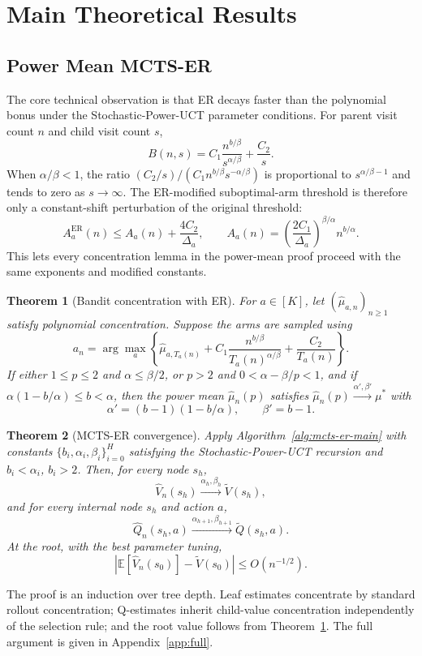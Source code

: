 \documentclass{article}
\newtheorem{theorem}{Theorem}
\newcommand{\E}{\mathbb{E}}
\newcommand{\Vhat}{\widehat{V}}
\newcommand{\Qhat}{\widehat{Q}}
\newcommand{\muhat}{\widehat{\mu}}
\begin{document}
\section{Main Theoretical Results}
\label{sec:main_results}
\subsection{Power Mean MCTS-ER}
\label{sec:main_power_results}
The core technical observation is that ER decays faster than the polynomial bonus under the Stochastic-Power-UCT parameter conditions.  For parent visit count $n$ and child visit count $s$,
\begin{equation}
B(n,s)=C_1\frac{n^{b/\beta}}{s^{\alpha/\beta}}+\frac{C_2}{s}.
\label{eq:main_combined_bonus}
\end{equation}
When $\alpha/\beta<1$, the ratio $(C_2/s)/(C_1n^{b/\beta}s^{-\alpha/\beta})$ is proportional to $s^{\alpha/\beta-1}$ and tends to zero as $s\to\infty$.  The ER-modified suboptimal-arm threshold is therefore only a constant-shift perturbation of the original threshold:
\begin{equation}
A_a^{\mathrm{ER}}(n)\leq A_a(n)+\frac{4C_2}{\Delta_a},\qquad
A_a(n)=\left(\frac{2C_1}{\Delta_a}\right)^{\beta/\alpha}n^{b/\alpha}.
\label{eq:main_threshold}
\end{equation}
This lets every concentration lemma in the power-mean proof proceed with the same exponents and modified constants.

\begin{theorem}[Bandit concentration with ER]
\label{thm:main_bandit_er_statement}
For $a\in[K]$, let $(\muhat_{a,n})_{n\geq1}$ satisfy polynomial concentration.  Suppose the arms are sampled using
\[
a_n=\arg\max_a\left\{\muhat_{a,T_a(n)}+C_1\frac{n^{b/\beta}}{T_a(n)^{\alpha/\beta}}+\frac{C_2}{T_a(n)}\right\}.
\]
If either $1\leq p\leq2$ and $\alpha\leq\beta/2$, or $p>2$ and $0<\alpha-\beta/p<1$, and if $\alpha(1-b/\alpha)\leq b<\alpha$, then the power mean $\muhat_n(p)$ satisfies $\muhat_n(p)\xrightarrow{\alpha',\beta'}\mu^*$ with
\[
\alpha'=(b-1)(1-b/\alpha),\qquad \beta'=b-1.
\]
\end{theorem}

\begin{theorem}[MCTS-ER convergence]
\label{thm:main_mcts_er_statement}
Apply Algorithm~\ref{alg:mcts-er-main} with constants $\{b_i,\alpha_i,\beta_i\}_{i=0}^H$ satisfying the Stochastic-Power-UCT recursion and $b_i<\alpha_i$, $b_i>2$.  Then, for every node $s_h$,
\[
\Vhat_n(s_h)\xrightarrow{\alpha_h,\beta_h}\widetilde{V}(s_h),
\]
and for every internal node $s_h$ and action $a$,
\[
\Qhat_n(s_h,a)\xrightarrow{\alpha_{h+1},\beta_{h+1}}\widetilde{Q}(s_h,a).
\]
At the root, with the best parameter tuning,
\[
\left|\E[\Vhat_n(s_0)]-\widetilde{V}(s_0)\right|\leq O(n^{-1/2}).
\]
\end{theorem}
The proof is an induction over tree depth.  Leaf estimates concentrate by standard rollout concentration; Q-estimates inherit child-value concentration independently of the selection rule; and the root value follows from Theorem~\ref{thm:main_bandit_er_statement}.  The full argument is given in Appendix~\ref{app:full}.
\end{document}
